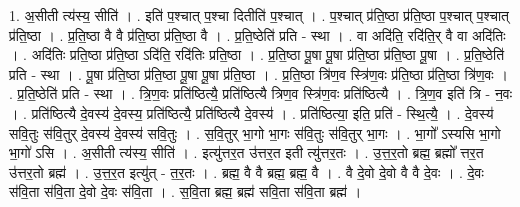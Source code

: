 \documentclass[17pt]{extarticle}
\begin{document}
1. अ॒सीती त्य॑स्य॒ सीति॑ । . इति॑ प॒श्चात् प॒श्चा दितीति॑ प॒श्चात् । . प॒श्चात् प्र॑ति॒ष्ठा प्र॑ति॒ष्ठा प॒श्चात् प॒श्चात् प्र॑ति॒ष्ठा । . प्र॒ति॒ष्ठा वै वै प्र॑ति॒ष्ठा प्र॑ति॒ष्ठा वै । . प्र॒ति॒ष्ठेति॑ प्रति - स्था । . वा अदि॑ति॒ रदि॑ति॒र् वै वा अदि॑तिः । . अदि॑तिः प्रति॒ष्ठा प्र॑ति॒ष्ठा ऽदि॑ति॒ रदि॑तिः प्रति॒ष्ठा । . प्र॒ति॒ष्ठा पू॒षा पू॒षा प्र॑ति॒ष्ठा प्र॑ति॒ष्ठा पू॒षा । . प्र॒ति॒ष्ठेति॑ प्रति - स्था । . पू॒षा प्र॑ति॒ष्ठा प्र॑ति॒ष्ठा पू॒षा पू॒षा प्र॑ति॒ष्ठा । . प्र॒ति॒ष्ठा त्रि॑ण॒व स्त्रि॑ण॒वः प्र॑ति॒ष्ठा प्र॑ति॒ष्ठा त्रि॑ण॒वः । . प्र॒ति॒ष्ठेति॑ प्रति - स्था । . त्रि॒ण॒वः प्रति॑ष्ठित्यै॒ प्रति॑ष्ठित्यै त्रिण॒व स्त्रि॑ण॒वः प्रति॑ष्ठित्यै । . त्रि॒ण॒व इति॑ त्रि - न॒वः । . प्रति॑ष्ठित्यै दे॒वस्य॑ दे॒वस्य॒ प्रति॑ष्ठित्यै॒ प्रति॑ष्ठित्यै दे॒वस्य॑ । . प्रति॑ष्ठित्या॒ इति॒ प्रति॑ - स्थि॒त्यै॒ । . दे॒वस्य॑ सवि॒तुः स॑वि॒तुर् दे॒वस्य॑ दे॒वस्य॑ सवि॒तुः । . स॒वि॒तुर् भा॒गो भा॒गः स॑वि॒तुः स॑वि॒तुर् भा॒गः । . भा॒गो᳚ ऽस्यसि भा॒गो भा॒गो॑ ऽसि । . अ॒सीती त्य॑स्य॒ सीति॑ । . इत्यु॑त्तर॒त उ॑त्तर॒त इती त्यु॑त्तर॒तः । . उ॒त्त॒र॒तो ब्रह्म॒ ब्रह्मो᳚ त्तर॒त उ॑त्तर॒तो ब्रह्म॑ । . उ॒त्त॒र॒त इत्यु॑त् - त॒र॒तः । . ब्रह्म॒ वै वै ब्रह्म॒ ब्रह्म॒ वै । . वै दे॒वो दे॒वो वै वै दे॒वः । . दे॒वः स॑वि॒ता स॑वि॒ता दे॒वो दे॒वः स॑वि॒ता । . स॒वि॒ता ब्रह्म॒ ब्रह्म॑ सवि॒ता स॑वि॒ता ब्रह्म॑ । \newline
\end{document}
